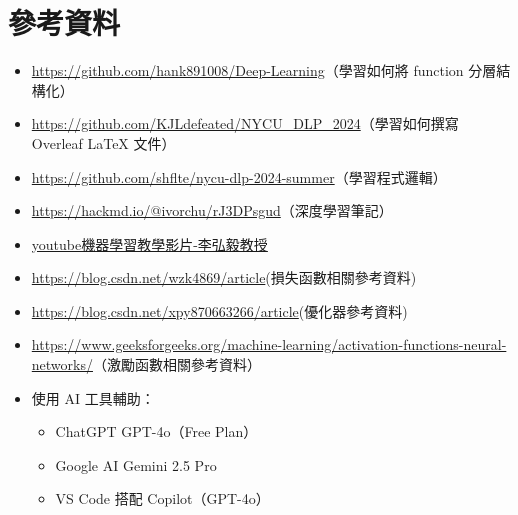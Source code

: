 \documentclass{article}
\begin{document}
\section{參考資料}
\begin{itemize}
  \item \href{https://github.com/hank891008/Deep-Learning}{https://github.com/hank891008/Deep-Learning}（學習如何將 function 分層結構化）
  \item \href{https://github.com/KJLdefeated/NYCU_DLP_2024}{https://github.com/KJLdefeated/NYCU\_DLP\_2024}（學習如何撰寫 Overleaf LaTeX 文件）
  \item \href{https://github.com/shflte/nycu-dlp-2024-summer}{https://github.com/shflte/nycu-dlp-2024-summer}（學習程式邏輯）
  \item \href{https://hackmd.io/@ivorchu/rJ3DPsgud}{https://hackmd.io/@ivorchu/rJ3DPsgud}（深度學習筆記）
  \item \href{https://youtube.com/playlist?list=PLJV_el3uVTsMhtt7_Y6sgTHGHp1Vb2P2J&si=17mjOUjyCP2tRXVk}{youtube機器學習教學影片-李弘毅教授}
  \item \href{https://blog.csdn.net/wzk4869/article/details/131409675}{https://blog.csdn.net/wzk4869/article}(損失函數相關參考資料)
  \item \href{https://blog.csdn.net/xpy870663266/article/details/104794371}{https://blog.csdn.net/xpy870663266/article}(優化器參考資料)
  \item \href{https://www.geeksforgeeks.org/machine-learning/activation-functions-neural-networks/}{https://www.geeksforgeeks.org/machine-learning/activation-functions-neural-networks/}（激勵函數相關參考資料）
  \item 使用 AI 工具輔助：
  \begin{itemize}
    \item ChatGPT GPT-4o（Free Plan）
    \item Google AI Gemini 2.5 Pro
    \item VS Code 搭配 Copilot（GPT-4o）
  \end{itemize}
\end{itemize}
\end{document}
